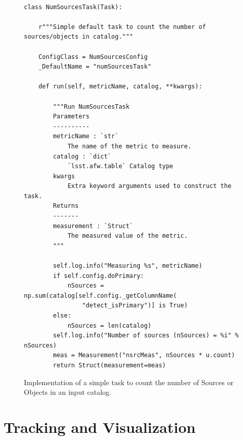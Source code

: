 \begin{figure}[!htp]

  \lstset{language=python}
  \begin{lstlisting}
  
class NumSourcesTask(Task):

    r"""Simple default task to count the number of sources/objects in catalog."""

    ConfigClass = NumSourcesConfig
    _DefaultName = "numSourcesTask"

    def run(self, metricName, catalog, **kwargs):

        """Run NumSourcesTask
        Parameters
        ----------
        metricName : `str`
            The name of the metric to measure.
        catalog : `dict`
            `lsst.afw.table` Catalog type
        kwargs
            Extra keyword arguments used to construct the task.
        Returns
        -------
        measurement : `Struct`
            The measured value of the metric.
        """

        self.log.info("Measuring %s", metricName)
        if self.config.doPrimary:
            nSources = np.sum(catalog[self.config._getColumnName(
                "detect_isPrimary")] is True)
        else:
            nSources = len(catalog)
        self.log.info("Number of sources (nSources) = %i" % nSources)
        meas = Measurement("nsrcMeas", nSources * u.count)
        return Struct(measurement=meas)    \end{lstlisting}
        
  \caption{Implementation of a simple task to count the number of Sources or Objects in an input catalog. }

  \label{fig:num_sources_task}
  \par\medskip
\end{figure}

\section{Tracking and Visualization} \label{sec:tracking}

